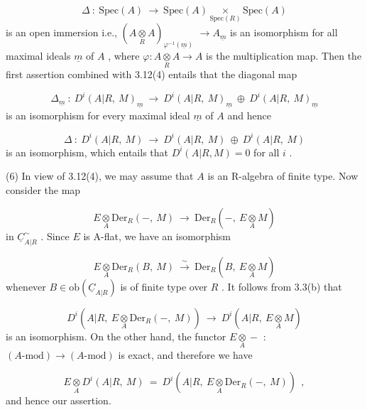 \begin{equation*}
\Delta \ : \ \mathrm{Spec}(A) \ \to \ \mathrm{Spec}(A) \underset{\mathrm{Spec}(R)}{\times} \mathrm{Spec}(A)
\end{equation*}
is an open immersion i.e.,  $(A \underset{R}{\otimes} A)_{\varphi^{-1}(\underline{m})}$  $\to A_{\underline{m}}$  is an isomorphism for all maximal ideals  $\underline{m}$  of  $A$  , where  $\varphi : A \underset{R}{\otimes} A \to A$  is the multiplication map. Then the first assertion combined with 3.12(4) entails that the diagonal map

\begin{equation*}
\Delta_{\underline{m}} \ : \ D^i(A|R, \ M)_{\underline{m}} \ \to \ D^i(A|R, \ M)_{\underline{m}} \ \oplus \ D^i(A|R, \ M)_{\underline{m}}
\end{equation*}
is an isomorphism for every maximal ideal  $\underline{m}$  of  $A$  and hence

\begin{equation*}
\Delta \ : \ D^i(A|R, \ M) \ \to \ D^i(A|R, \ M) \ \oplus \ D^i(A|R, \ M)
\end{equation*}
is an isomorphism, which entails that  $D^i(A|R, M) = 0$  for all  $i$  .

(6)  In view of 3.12(4), we may assume that  $A$  is an R-algebra of finite type. Now consider the map

\begin{equation*}
E \underset{A}{\otimes} \mathrm{Der}_R(-, \ M) \ \to \ \mathrm{Der}_R(-, \ E \underset{A}{\otimes} M)
\end{equation*}
in  $\underline{C}^{\sim}_{A|R}$  . Since  $E$  is A-flat, we have an isomorphism

\begin{equation*}
E \underset{A}{\otimes} \mathrm{Der}_R(B, \ M) \ \overset{\sim}{\longrightarrow} \ \mathrm{Der}_R(B, \ E \underset{A}{\otimes} M)
\end{equation*}
whenever  $B \in \mathrm{ob}(\underline{C}_{A|R})$  is of finite type over  $R$  . It follows from 3.3(b) that

\begin{equation*}
D^i(A|R, \ E \underset{A}{\otimes} \mathrm{Der}_R(-, \ M)) \ \to \ D^i(A|R, \ E \underset{A}{\otimes} M)
\end{equation*}
is an isomorphism. On the other hand, the functor  $E \underset{A}{\otimes} -$  :  $(A\text{-mod}) \to (A\text{-mod})$  is exact, and therefore we have

\begin{equation*}
E \underset{A}{\otimes} D^i(A|R, \ M) \ = \ D^i(A|R, \ E \underset{A}{\otimes} \mathrm{Der}_R(-, \ M)) \ \ ,
\end{equation*}
and hence our assertion.

